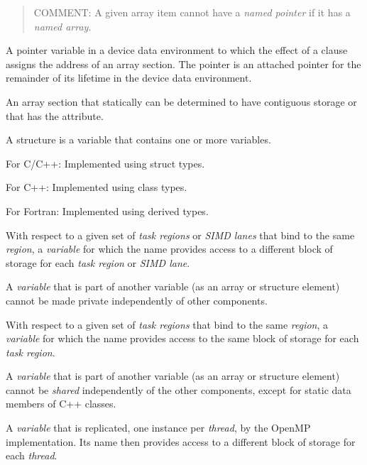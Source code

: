 \begin{quote}
COMMENT: A given array item cannot have a \emph{named pointer} if it has a \emph{named array}.
\end{quote}
\glossarydefend


\glossarydefstart
A pointer variable in a device data environment to which the effect of a  clause
assigns the address of
an array section.  The pointer is
an attached pointer for the remainder of its lifetime in the device data environment.
\glossarydefend
\bigskip

\glossarydefstart
An array section that statically can be determined to have contiguous storage or that has the  attribute.
\glossarydefend
\bigskip

\glossarydefstart
A structure is a variable that contains one or more variables.

For C/C++:
\nopagebreak
Implemented using struct types.

For C++:
\nopagebreak
Implemented using class types.

For Fortran:
\nopagebreak
Implemented using derived types.
\glossarydefend

\glossarydefstart
With respect to a given set of \emph{task regions} or \emph{SIMD lanes} that bind to the same
 \emph{region}, a \emph{variable} for which the name provides access to a different block of
storage for each \emph{task region} or \emph{SIMD lane}.

A \emph{variable} that is part of another variable (as an array or structure element) cannot
be made private independently of other components.
\glossarydefend

\glossarydefstart
With respect to a given set of \emph{task regions} that bind to the same 
\emph{region}, a \emph{variable} for which the name provides access to the same block of storage for
each \emph{task region}.

A \emph{variable} that is part of another variable (as an array or structure element) cannot
be \emph{shared} independently of the other components, except for static data members
of C++ classes.
\glossarydefend

\glossarydefstart
A \emph{variable} that is replicated, one instance per \emph{thread}, by the OpenMP
implementation. Its name then provides access to a different block of storage for
each \emph{thread}.

